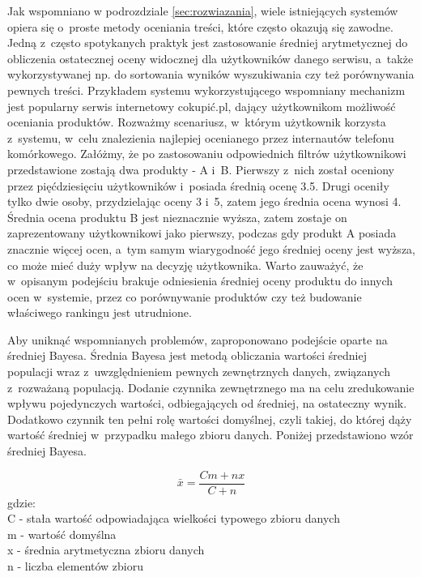 Jak wspomniano w podrozdziale \ref{sec:rozwiazania}, wiele istniejących systemów opiera się o~proste metody oceniania treści, które często okazują się zawodne. Jedną z~często spotykanych praktyk jest zastosowanie średniej arytmetycznej do obliczenia ostatecznej oceny widocznej dla użytkowników danego serwisu, a~także wykorzystywanej np. do sortowania wyników wyszukiwania czy też porównywania pewnych treści. Przykładem systemu wykorzystującego wspomniany mechanizm jest popularny serwis internetowy cokupić.pl, dający użytkownikom możliwość oceniania produktów. Rozważmy scenariusz, w~którym użytkownik korzysta z~systemu, w~celu znalezienia najlepiej ocenianego przez internautów telefonu komórkowego. Załóżmy, że po zastosowaniu odpowiednich filtrów użytkownikowi przedstawione zostają dwa produkty - A i~B. Pierwszy z~nich został oceniony przez pięćdziesięciu użytkowników i~posiada średnią ocenę 3.5. Drugi oceniły tylko dwie osoby, przydzielając oceny 3 i~5, zatem jego średnia ocena wynosi 4. Średnia ocena produktu B jest nieznacznie wyższa, zatem zostaje on zaprezentowany użytkownikowi jako pierwszy, podczas gdy produkt A posiada znacznie więcej ocen, a~tym samym wiarygodność jego średniej oceny jest wyższa, co może mieć duży wpływ na decyzję użytkownika. Warto zauważyć, że w~opisanym podejściu brakuje odniesienia średniej oceny produktu do innych ocen w~systemie, przez co porównywanie produktów czy też budowanie właściwego rankingu jest utrudnione.

Aby uniknąć wspomnianych problemów, zaproponowano podejście oparte na średniej Bayesa. Średnia Bayesa jest metodą obliczania wartości średniej populacji wraz z~uwzględnieniem pewnych zewnętrznych danych, związanych z~rozważaną populacją. Dodanie czynnika zewnętrznego ma na celu zredukowanie wpływu pojedynczych wartości, odbiegających od średniej, na ostateczny wynik. Dodatkowo czynnik ten pełni rolę wartości domyślnej, czyli takiej, do której dąży wartość średniej w~przypadku małego zbioru danych.\cite{bayesWiki} Poniżej przedstawiono wzór średniej Bayesa.

\begin{equation}
\bar{x}=\frac{Cm+nx}{C+n}
\end{equation}
gdzie:\\
C - stała wartość odpowiadająca wielkości typowego zbioru danych\\
m - wartość domyślna\\
x - średnia arytmetyczna zbioru danych\\
n - liczba elementów zbioru\\


